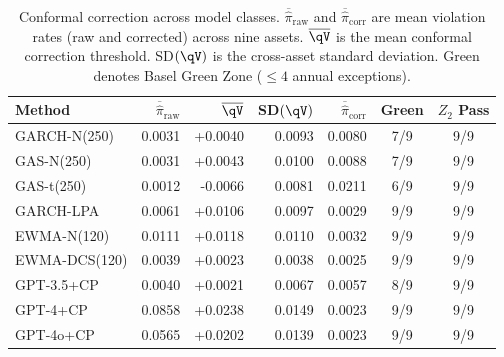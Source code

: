 \begin{table}[htbp]
\centering
\caption{Conformal correction across model classes. $\overline{\hat{\pi}}_{\mathrm{raw}}$ and $\overline{\hat{\pi}}_{\mathrm{corr}}$ are mean violation rates (raw and corrected) across nine assets. $\overline{\qV}$ is the mean conformal correction threshold. SD$(\qV)$ is the cross-asset standard deviation. Green denotes Basel Green Zone ($\leq 4$ annual exceptions).}
\label{tab:conformal_all_methods}
\small
\begin{tabular}{l r r r r c c}
\toprule
Method & $\overline{\hat{\pi}}_{\mathrm{raw}}$ & $\overline{\qV}$ & SD$(\qV)$ & $\overline{\hat{\pi}}_{\mathrm{corr}}$ & Green & $Z_2$ Pass \\
\midrule
  GARCH-N(250) & 0.0031 & +0.0040 & 0.0093 & 0.0080 & 7/9 & 9/9 \\
  GAS-N(250) & 0.0031 & +0.0043 & 0.0100 & 0.0088 & 7/9 & 9/9 \\
  GAS-t(250) & 0.0012 & -0.0066 & 0.0081 & 0.0211 & 6/9 & 9/9 \\
  GARCH-LPA & 0.0061 & +0.0106 & 0.0097 & 0.0029 & 9/9 & 9/9 \\
  EWMA-N(120) & 0.0111 & +0.0118 & 0.0110 & 0.0032 & 9/9 & 9/9 \\
  EWMA-DCS(120) & 0.0039 & +0.0023 & 0.0038 & 0.0025 & 9/9 & 9/9 \\
\midrule
  GPT-3.5+CP & 0.0040 & +0.0021 & 0.0067 & 0.0057 & 8/9 & 9/9 \\
  GPT-4+CP & 0.0858 & +0.0238 & 0.0149 & 0.0023 & 9/9 & 9/9 \\
  GPT-4o+CP & 0.0565 & +0.0202 & 0.0139 & 0.0023 & 9/9 & 9/9 \\
\bottomrule
\end{tabular}
\end{table}
